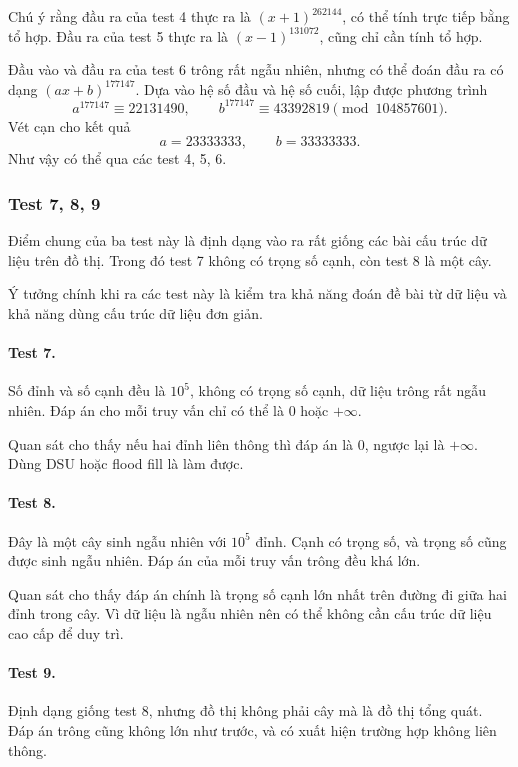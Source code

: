 \documentclass[11pt]{article}
\begin{document}
Chú ý rằng đầu ra của test 4 thực ra là \((x+1)^{262144}\), có thể tính trực
tiếp bằng tổ hợp. Đầu ra của test 5 thực ra là \((x-1)^{131072}\), cũng chỉ cần
tính tổ hợp.

Đầu vào và đầu ra của test 6 trông rất ngẫu nhiên, nhưng có thể đoán đầu ra có
dạng \((ax+b)^{177147}\). Dựa vào hệ số đầu và hệ số cuối, lập được phương
trình
\[
  a^{177147}\equiv 22131490,\qquad
  b^{177147}\equiv 43392819 \pmod{104857601}.
\]
Vét cạn cho kết quả
\[
  a=23333333,\qquad b=33333333.
\]
Như vậy có thể qua các test 4, 5, 6.

\subsubsection{Test 7, 8, 9}

Điểm chung của ba test này là định dạng vào ra rất giống các bài cấu trúc dữ
liệu trên đồ thị. Trong đó test 7 không có trọng số cạnh, còn test 8 là một
cây.

Ý tưởng chính khi ra các test này là kiểm tra khả năng đoán đề bài từ dữ liệu
và khả năng dùng cấu trúc dữ liệu đơn giản.

\paragraph{Test 7.}
Số đỉnh và số cạnh đều là \(10^5\), không có trọng số cạnh, dữ liệu trông rất
ngẫu nhiên. Đáp án cho mỗi truy vấn chỉ có thể là \(0\) hoặc \(+\infty\).

Quan sát cho thấy nếu hai đỉnh liên thông thì đáp án là \(0\), ngược lại là
\(+\infty\). Dùng DSU hoặc flood fill là làm được.

\paragraph{Test 8.}
Đây là một cây sinh ngẫu nhiên với \(10^5\) đỉnh. Cạnh có trọng số, và trọng số
cũng được sinh ngẫu nhiên. Đáp án của mỗi truy vấn trông đều khá lớn.

Quan sát cho thấy đáp án chính là trọng số cạnh lớn nhất trên đường đi giữa
hai đỉnh trong cây. Vì dữ liệu là ngẫu nhiên nên có thể không cần cấu trúc dữ
liệu cao cấp để duy trì.

\paragraph{Test 9.}
Định dạng giống test 8, nhưng đồ thị không phải cây mà là đồ thị tổng quát. Đáp
án trông cũng không lớn như trước, và có xuất hiện trường hợp không liên thông.
\end{document}
